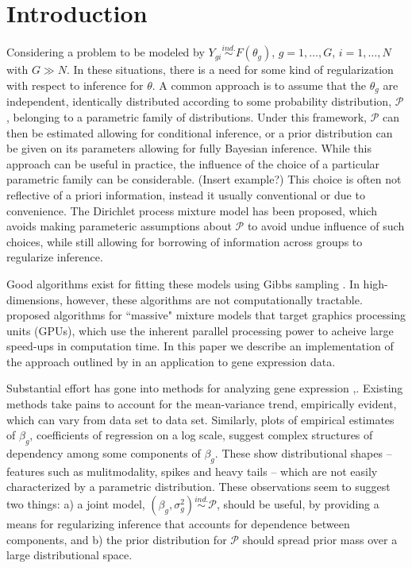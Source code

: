 \newcommand{\ind}{\stackrel{ind.}{\sim}}
\newcommand{\op}{\operatorname}
\newcommand{\code}{\texttt}

\section{Introduction}
Considering a problem to be modeled by $Y_{gi} \ind F(\theta_{g})$, $g=1,\ldots,G$, $i=1,\ldots,N$ with $G\gg N$. In these situations, there is a need for some kind of regularization with respect to inference for $\theta$. A common approach is to assume that the $\theta_g$ are independent, identically distributed according to some probability distribution, $\mathcal{P}$, belonging to a parametric family of distributions. Under this framework, $\mathcal{P}$ can then be estimated allowing for conditional inference, or a prior distribution can be given on its parameters allowing for fully Bayesian inference. While this approach can be useful in practice, the influence of the choice of a particular parametric family can be considerable. (Insert example?) This choice is often not reflective of a priori information, instead it usually conventional or due to convenience. The Dirichlet process mixture model has been proposed, which avoids making parameteric assumptions about $\mathcal{P}$ to avoid undue influence of such choices, while still allowing for borrowing of information across groups to regularize inference.

Good algorithms exist for fitting these models using Gibbs sampling \cite{neal2000}. In high-dimensions, however, these algorithms are not computationally tractable. \citet{suchard} proposed algorithms for ``massive" mixture models that target graphics processing units (GPUs), which use the inherent parallel processing power to acheive large speed-ups in computation time. In this paper we describe an implementation of the approach outlined by \citet{suchard} in an application to gene expression data.

Substantial effort has gone into methods for analyzing gene expression \cite{edger2010},\cite{deseq2014}. Existing methods take pains to account for the mean-variance trend, empirically evident, which can vary from data set to data set. Similarly, plots of empirical estimates of $\beta_g$, coefficients of regression on a log scale, suggest complex structures of dependency among some components of $\beta_g$. These show distributional shapes -- features such as mulitmodality, spikes and heavy tails -- which are not easily characterized by a parametric distribution. These observations seem to suggest two things: a) a joint model, $(\beta_g, \sigma^2_g) \ind \mathcal{P}$, should be useful, by providing a means for regularizing inference that accounts for dependence between components, and b) the prior distribution for $\mathcal{P}$ should spread prior mass over a large distributional space.


